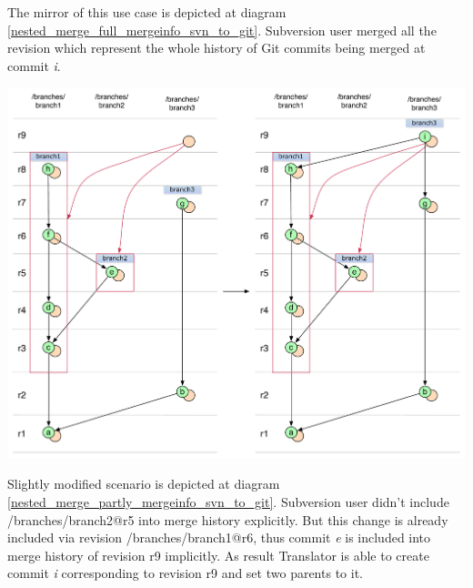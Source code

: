 The mirror of this use case is depicted at diagram \ref{nested_merge_full_mergeinfo_svn_to_git}. Subversion user merged all the revision which represent the whole history of Git commits being merged at commit \emph{i}.

\begin{center}
\includegraphics[width=\textwidth]{img/diagrams/nested_merge_full_mergeinfo_svn_to_git.pdf}%
\label{nested_merge_full_mergeinfo_svn_to_git}%
\end{center}

Slightly modified scenario is depicted at diagram \ref{nested_merge_partly_mergeinfo_svn_to_git}. Subversion user didn't include /branches/branch2@r5 into merge history explicitly. But this change is already included via revision /branches/branch1@r6, thus commit \emph{e} is included into merge history of revision r9 implicitly. As result Translator is able to create commit \emph{i} corresponding to revision r9 and set two parents to it.

